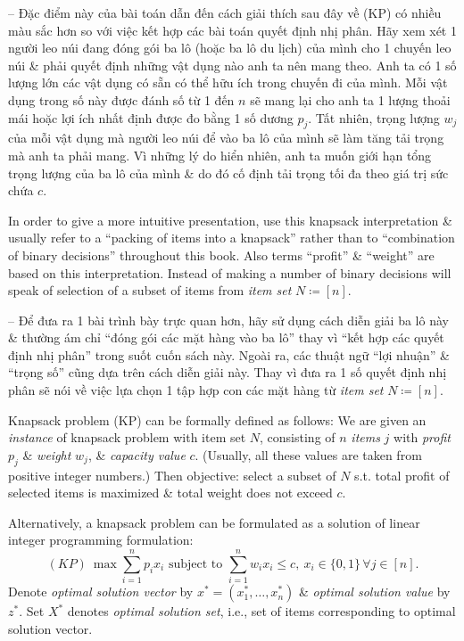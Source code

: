 \documentclass{article}
\begin{document}
\begin{itemize}
\begin{itemize}
        -- Đặc điểm này của bài toán dẫn đến cách giải thích sau đây về (KP) có nhiều màu sắc hơn so với việc kết hợp các bài toán quyết định nhị phân. Hãy xem xét 1 người leo núi đang đóng gói ba lô (hoặc ba lô du lịch) của mình cho 1 chuyến leo núi \& phải quyết định những vật dụng nào anh ta nên mang theo. Anh ta có 1 số lượng lớn các vật dụng có sẵn có thể hữu ích trong chuyến đi của mình. Mỗi vật dụng trong số này được đánh số từ 1 đến $n$ sẽ mang lại cho anh ta 1 lượng thoải mái hoặc lợi ích nhất định được đo bằng 1 số dương $p_j$. Tất nhiên, trọng lượng $w_j$ của mỗi vật dụng mà người leo núi để vào ba lô của mình sẽ làm tăng tải trọng mà anh ta phải mang. Vì những lý do hiển nhiên, anh ta muốn giới hạn tổng trọng lượng của ba lô của mình \& do đó cố định tải trọng tối đa theo giá trị sức chứa $c$.

        In order to give a more intuitive presentation, use this knapsack interpretation \& usually refer to a ``packing of items into a knapsack'' rather than to ``combination of binary decisions'' throughout this book. Also terms ``profit'' \& ``weight'' are based on this interpretation. Instead of making a number of binary decisions will speak of selection of a subset of items from {\it item set} $N\coloneqq[n]$.

        -- Để đưa ra 1 bài trình bày trực quan hơn, hãy sử dụng cách diễn giải ba lô này \& thường ám chỉ ``đóng gói các mặt hàng vào ba lô'' thay vì ``kết hợp các quyết định nhị phân'' trong suốt cuốn sách này. Ngoài ra, các thuật ngữ ``lợi nhuận'' \& ``trọng số'' cũng dựa trên cách diễn giải này. Thay vì đưa ra 1 số quyết định nhị phân sẽ nói về việc lựa chọn 1 tập hợp con các mặt hàng từ {\it item set} $N\coloneqq[n]$.

        Knapsack problem (KP) can be formally defined as follows: We are given an {\it instance} of knapsack problem with item set $N$, consisting of $n$ {\it items} $j$ with {\it profit} $p_j$ \& {\it weight} $w_j$, \& {\it capacity value} $c$. (Usually, all these values are taken from positive integer numbers.) Then objective: select a subset of $N$ s.t. total profit of selected items is maximized \& total weight does not exceed $c$.

        Alternatively, a knapsack problem can be formulated as a solution of linear integer programming formulation:
        \begin{equation*}
            (KP)\ \max\sum_{i=1}^n p_ix_i\mbox{ subject to }\sum_{i=1}^n w_ix_i\le c,\ x_i\in\{0,1\}\,\forall j\in[n].
        \end{equation*}
        Denote {\it optimal solution vector} by $x^* = (x_1^*,\ldots,x_n^*)$ \& {\it optimal solution value} by $z^*$. Set $X^*$ denotes {\it optimal solution set}, i.e., set of items corresponding to optimal solution vector.


\end{itemize}
\end{itemize}
\end{document}
